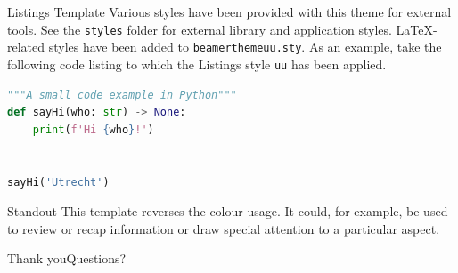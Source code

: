 \documentclass[aspectratio=169, 10pt]{beamer}
\begin{document}
    \begin{frame}[fragile]{Listings Template}
        Various styles have been provided with this theme for external tools. See the \texttt{styles} folder for external library and application styles. LaTeX-related styles have been added to \texttt{beamerthemeuu.sty}. As an example, take the following code listing to which the Listings style \texttt{uu} has been applied.

        \begin{lstlisting}[language=python, style=uu]
"""A small code example in Python"""
def sayHi(who: str) -> None:
    print(f'Hi {who}!')


sayHi('Utrecht')
        \end{lstlisting}
    \end{frame}

    \begin{frame}[c, standout]{Standout}
        This template reverses the colour usage. It could, for example, be used to review or recap information or draw special attention to a particular aspect.
    \end{frame}

    \begin{frame}[plain]
        \Closure
            {Thank you}{Questions?}
    \end{frame}

\end{document}
